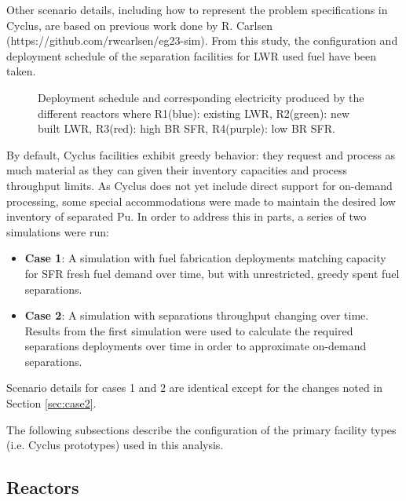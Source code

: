\documentclass[12pt]{article}
\begin{document}
Other scenario details, including how to represent the problem specifications in Cyclus,
are based on previous work done by R. Carlsen
(https://github.com/rwcarlsen/eg23-sim).  From this study, the configuration
and deployment schedule of the separation facilities for LWR used fuel have
been taken.

\begin{figure}[h!]
    \centering
    \caption{
        Deployment schedule and corresponding electricity produced by the
        different reactors where R1(blue): existing LWR, R2(green): new
        built LWR, R3(red): high BR SFR, R4(purple): low BR SFR. 
        \label{fig:deployment}
    }
\end{figure}

By default, Cyclus facilities exhibit greedy behavior: they request and
process as much material as they can given their inventory capacities and
process throughput limits. As Cyclus does not yet include direct support for on-demand
processing, some special accommodations were made to maintain the desired low
inventory of separated Pu. In order to address this in parts, a series of two
simulations were run:

\begin{itemize}

    \item \textbf{Case 1}: A simulation with fuel fabrication deployments
        matching capacity for SFR fresh fuel demand over time, but with
        unrestricted, greedy spent fuel separations.

    \item \textbf{Case 2}: A simulation with separations throughput changing
        over time. Results from the first simulation were used to calculate
        the required separations deployments over time in order to approximate
        on-demand separations.

\end{itemize}

Scenario details for cases 1 and 2 are identical except for the changes noted in
Section \ref{sec:case2}.

The following subsections describe the configuration of the primary facility
types (i.e. Cyclus prototypes) used in this analysis.

\subsection{Reactors}
\end{document}
